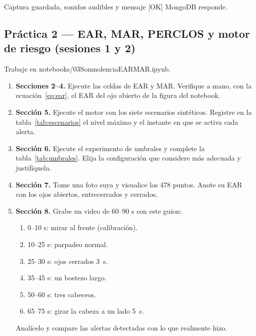 \documentclass[11pt,a4paper]{article}
\newcommand{\codigoguion}{\textunderscore\allowbreak}
\newcommand{\codigo}[1]{{\small\ttfamily\let\_\codigoguion #1}}
\begin{document}
\begin{verificacion}
Captura guardada, sonidos audibles y mensaje \codigo{[OK] MongoDB responde}.
\end{verificacion}

\subsection{Práctica 2 — EAR, MAR, PERCLOS y motor de riesgo (sesiones 1 y 2)}
Trabaje en \codigo{notebooks/03\_Somnolencia\_EAR\_MAR.ipynb}.
\begin{enumerate}
  \item \textbf{Secciones 2–4.} Ejecute las celdas de EAR y MAR. Verifique a mano, con la
        ecuación~\eqref{eq:ear}, el EAR del ojo abierto de la figura del notebook.
  \item \textbf{Sección 5.} Ejecute el motor con los siete escenarios sintéticos. Registre en la
        tabla~\ref{tab:escenarios} el nivel máximo y el instante en que se activa cada alerta.
  \item \textbf{Sección 6.} Ejecute el experimento de umbrales y complete la tabla~\ref{tab:umbrales}.
        Elija la configuración que considere más adecuada y justifíquela.
  \item \textbf{Sección 7.} Tome una foto suya y visualice los 478 puntos. Anote su EAR con los ojos
        abiertos, entrecerrados y cerrados.
  \item \textbf{Sección 8.} Grabe un video de 60–90 s con este guion:
        \begin{enumerate}[label=\alph*)]
          \item 0–10 s: mirar al frente (calibración).
          \item 10–25 s: parpadeo normal.
          \item 25–30 s: ojos cerrados \SI{3}{s}.
          \item 35–45 s: un bostezo largo.
          \item 50–60 s: tres cabeceos.
          \item 65–75 s: girar la cabeza a un lado \SI{5}{s}.
        \end{enumerate}
        Analícelo y compare las alertas detectadas con lo que realmente hizo.
\end{enumerate}
\end{document}
